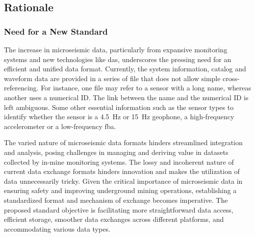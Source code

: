 \subsection{Rationale}

\subsubsection{Need for a New Standard}

The increase in microseismic data, particularly from expansive monitoring systems and new technologies like \gls{das}, underscores the pressing need for an efficient and unified data format. Currently, the system information, catalog and waveform data are provided in a series of file that does not allow simple cross-referencing. For instance, one file may refer to a sensor with a long name, whereas another uses a numerical ID. The link between the name and the numerical ID is left ambiguous. Some other essential information such as the sensor types to identify whether the sensor is a \SI{4.5}{\hertz} or \SI{15}{\hertz} geophone, a high-frequency accelerometer or a low-frequency \gls{fba}. 

The varied nature of microseismic data formats hinders streamlined integration and analysis, posing challenges in managing and deriving value in datasets collected by in-mine monitoring systems. The lossy and incoherent nature of current data exchange formats hinders innovation and makes the utilization of \museismic data unnecessarily tricky. Given the critical importance of microseismic data in ensuring safety and improving underground mining operations, establishing a standardized format and mechanism of exchange becomes imperative. The proposed standard objective is facilitating more straightforward data access, efficient storage, smoother data exchanges across different platforms, and accommodating various data types.

